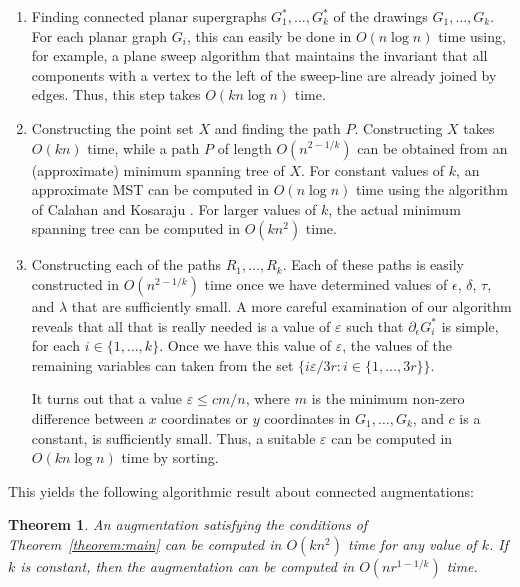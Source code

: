 \documentclass[11pt]{patmorin}
\newtheorem{theorem}{Theorem}[section]
\begin{document}
\begin{enumerate}
  \item Finding connected planar supergraphs $G_1^*,\ldots,G_k^*$
  of the drawings $G_1,\ldots,G_k$.  For each planar graph $G_i$, this
  can easily be done in $O(n\log n)$ time using, for example, a plane
  sweep algorithm that maintains the invariant that all components with
  a vertex to the left of the sweep-line are already joined by edges.
  Thus, this step takes $O(kn\log n)$ time.

  \item Constructing the point set $X$ and finding the path
  $P$.  Constructing $X$ takes $O(kn)$ time, while a path $P$ of length
  $O(n^{2-1/k})$ can be obtained from an (approximate) minimum spanning
  tree of $X$.  For constant values of $k$, an approximate MST can
  be computed in $O(n\log n)$ time using the algorithm of Calahan and
  Kosaraju \cite{callahan.kosaraju:faster}.  For larger values of $k$,
  the actual minimum spanning tree can be computed in $O(kn^2)$ time.

  \item Constructing each of the paths $R_1,\ldots,R_k$.
  Each of these paths is easily constructed in $O(n^{2-1/k})$ time
  once we have determined values of $\epsilon$, $\delta$, $\tau$, and
  $\lambda$ that are sufficiently small.  A more careful examination
  of our algorithm reveals that all that is really needed is
  a value of $\varepsilon$ such that $\partial_\epsilon G_i^*$ is
  simple, for each $i\in\{1,\ldots,k\}$.  Once we have this value of
  $\varepsilon$, the values of the remaining variables can taken from
  the set $\{i\varepsilon/3r:i\in\{1,\ldots,3r\}\}$.

  It turns out that a value $\varepsilon \le cm/n$, where $m$ is the
  minimum non-zero difference between $x$ coordinates or $y$ coordinates
  in $G_1,\ldots,G_k$, and $c$ is a constant, is sufficiently small.
  Thus, a suitable $\varepsilon$ can be computed in $O(kn\log n)$ time
  by sorting.
\end{enumerate}

This yields the following algorithmic result about connected augmentations:

\begin{theorem}
  An augmentation satisfying the conditions of Theorem~\ref{theorem:main}
  can be computed in $O(kn^2)$ time for any value of $k$.  If $k$ is
  constant, then the augmentation can be computed in $O(nr^{1-1/k})$
  time.
\end{theorem}
\end{document}

